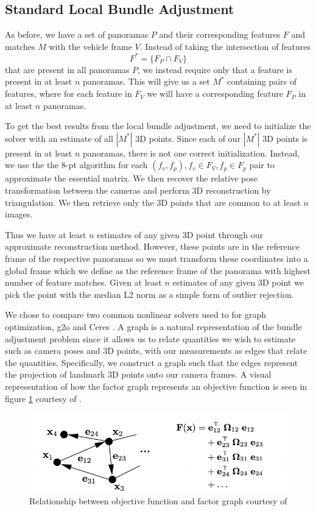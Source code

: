 \documentclass[conference]{IEEEtran}
\begin{document}
\subsection{Standard Local Bundle Adjustment}

As before, we have a set of panoramas  $P$ and their corresponding features $F$ and matches $M$ with the vehicle frame $V$. Instead of taking the intersection of features $$ F^* = \{F_P \cap F_V\} $$ that are present in all panoramas $P$, we instead require only that a feature is present in at least $n$ panoramas. This will give us a set $M^*$ containing pairs of features, where for each feature in $F_V$ we will have a corresponding feature $F_P$ in at least $n$ panoramas.

To get the best results from the local bundle adjustment, we need to initialize the solver with an estimate of all $|M^*|$ 3D points. Since each of our $|M^*|$ 3D points is present in at least $n$ panoramas, there is not one correct initialization. Instead, we use the the 8-pt algorithm for each $(f_v, f_p), f_v \in F_V, f_p \in F_p$ pair to approximate the essential matrix. We then recover the relative pose transformation between the cameras and perform 3D reconstruction by triangulation. We then retrieve only the 3D points that are common to at least $n$ images.

Thus we have at least $n$ estimates of any given 3D point through our approximate reconstruction method. However, these points are in the reference frame of the respective panoramas so we must transform these coordinates into a global frame which we define as the reference frame of the panorama with highest number of feature matches. Given at least $n$ estimates of any given 3D point we pick the point with the median L2 norm as a simple form of outlier rejection.

We chose to compare two common nonlinear solvers used to for graph optimization, g2o \cite{g2o} and Ceres \cite{ceres}. A graph is a natural representation of the bundle adjustment problem since it allows us to relate quantities we wish to estimate such as camera poses and 3D points, with our measurements as edges that relate the quantities. Specifically, we construct a graph such that the edges represent the projection of landmark 3D points onto our camera frames. A visual representation of how the factor graph represents an objective function is seen in figure \ref{factor} courtesy of \cite{g2o}.


\begin{figure}[htb]
\centerline{\includegraphics[scale=0.8]{Images/factor.png}}
\caption{Relationship between objective function and factor graph courtesy of \cite{g2o}}
\label{factor}
\end{figure}
\end{document}
